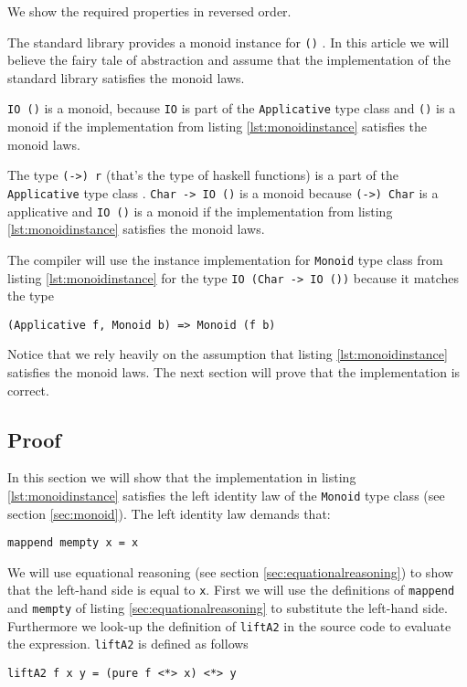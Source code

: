 We show the required properties in reversed order.

\begin{etaremune}
\item The standard library provides a monoid instance for \verb|()| \cite{monoid}. In this article we will believe the fairy tale of abstraction and assume that the implementation of the standard library satisfies the monoid laws.
\item \verb|IO ()| is a monoid, because \verb|IO| is part of the \verb|Applicative| type class \cite{control.applicative} and \verb|()| is a monoid if the implementation from listing \ref{lst:monoidinstance} satisfies the monoid laws.
\item The type \verb|(->) r| (that's the type of haskell functions) is a part of the \verb|Applicative| type class \cite{control.applicative}.
 \verb|Char -> IO ()| is a monoid because \verb|(->) Char| is a applicative and \verb|IO ()| is a monoid if the implementation from listing \ref{lst:monoidinstance} satisfies the monoid laws.
\item The compiler will use the instance implementation for \verb|Monoid| type class from listing \ref{lst:monoidinstance} for the type \verb|IO (Char -> IO ())| because it matches the type
\begin{verbatim}
(Applicative f, Monoid b) => Monoid (f b)
\end{verbatim}

\end{etaremune} 

Notice that we rely heavily on the assumption that listing \ref{lst:monoidinstance} satisfies the monoid laws. The next section will prove that the implementation is correct.

\subsection{Proof}
\label{sec:exampleproof}

In this section we will show that the implementation in listing \ref{lst:monoidinstance} satisfies the left identity law of the \verb|Monoid| type class (see section \ref{sec:monoid}).
The left identity law demands that:
\begin{verbatim}
mappend mempty x = x
\end{verbatim}

We will use equational reasoning (see section \ref{sec:equationalreasoning}) to show that the left-hand side is equal to \verb|x|. First we will use the definitions of \verb|mappend| and \verb|mempty| of listing \ref{sec:equationalreasoning} to substitute the left-hand side. Furthermore we look-up the definition of \verb|liftA2| in the source code \cite{control.applicative} to evaluate the expression. 
\verb|liftA2| is defined as follows
\begin{verbatim}
liftA2 f x y = (pure f <*> x) <*> y
\end{verbatim}

